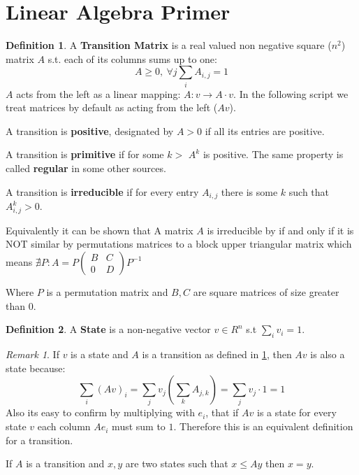 \documentclass[a4paper,10pt]{article}
\theoremstyle{definition}
\newtheorem{mydef}{Definition}[section]
\theoremstyle{remark}
\newtheorem{remark}{Remark}
\theoremstyle{plain}
\begin{document}
\section{Linear Algebra Primer}

\begin{mydef}
\label{def:transition}
A \textbf{Transition Matrix} is a real valued non negative square ($n^2$) matrix $A$ s.t. each of its
columns sums up to one: $$A \geq 0,\ \forall j \sum_i A_{i,j} = 1$$
$A$ acts from the left as a linear mapping:
$A:v \to A \cdot v$. In the following script we treat matrices by default
as acting from the left ($Av$). 

A transition is \textbf{positive}, designated by $A > 0$ if all its entries are positive.

A transition is \textbf{primitive} if for some $k>$ $A^k$ is positive. The same
property is called \textbf{regular} in some other sources.

A transition is \textbf{irreducible} if for every entry $A_{i,j}$ there is some $k$ such
that $A^k_{i,j} > 0$.

Equivalently it can be shown that 
A matrix $A$ is 
irreducible by if and only if it is NOT
similar by permutations matrices to a block upper triangular matrix
which means 
$
\nexists P : 
A =
P
\begin{pmatrix}
B & C \\
0 & D
\end{pmatrix}
P^{-1}
$

Where $P$ is a permutation matrix and $B, C$ are square matrices of size greater than $0$.
\end{mydef}

\begin{mydef}
\label{def:state}
A \textbf{State} is a non-negative vector $v \in R^n$ s.t $\sum_i v_i = 1$.
\end{mydef}

\begin{remark}
\label{remark:state}
If $v$ is a
state and $A$ is a transition as defined in
\ref{def:transition}, then
  $Av$ is also a state because: 
$$\sum_i(Av)_i = \sum_j v_j(\sum_k A_{j,k}) = \sum_j v_j \cdot 1 = 1$$
Also its easy to confirm by multiplying with $e_i$, that if $Av$ is a state
for every state $v$ 
each column $A e_i$ must sum to $1$.
Therefore this is an equivalent definition for a transition.

If $A$ is a transition and $x,y$ are two states such that
$x \leq Ay$ then $x=y$.
\end{remark}
\end{document}
